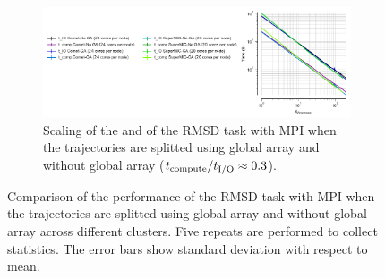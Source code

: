 \begin{figure}[ht!]
\begin{subfigure} {.8\textwidth}
  \includegraphics[width=\linewidth]{figures/Clusters_IO_compute_scaling_splitting.pdf}
  \caption{Scaling of the \tcomp and \tIO of the RMSD task with MPI when the trajectories are splitted using global array and without global array (${t}_{\text{compute}}/{t}_{\text{I/O}} \approx 0.3$).}
  \label{fig:compute-IO-scaling-clusters-splitting}
\end{subfigure}
%
\caption{Comparison of the performance of the RMSD task with MPI when the trajectories are splitted using global 
array and without global array across different clusters. Five repeats are performed to collect statistics. The error bars show
standard deviation with respect to mean.}
\label{fig:MPI-splitting-clusters}
\end{figure} 


